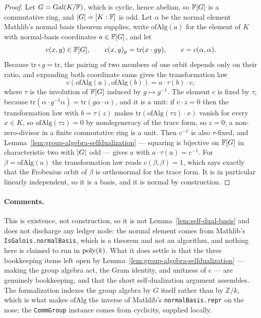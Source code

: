 \begin{proof}
\leanok
{}
Let $G = \mathrm{Gal}(K/\mathbb{F})$, which is cyclic, hence abelian, so $\mathbb{F}[G]$ is a commutative ring, and
$\left\vert {G} \right\vert = [K : \mathbb{F}]$ is odd. Let $\alpha$ be the normal element Mathlib's normal basis theorem
supplies, write $\mathrm{ofAlg}(a)$ for the element of $K$ with normal-basis coordinates
$a \in \mathbb{F}[G]$, and let
\[
  c(x, y) \in \mathbb{F}[G], \qquad c(x, y)_g = \mathrm{tr}(x \cdot g y), \qquad c = c(\alpha, \alpha).
\]
Because $\mathrm{tr} \circ g = \mathrm{tr}$, the pairing of two members of one orbit depends
only on their ratio, and expanding both coordinate sums gives the transformation law
\[
  c(\mathrm{ofAlg}(a), \mathrm{ofAlg}(b)) = a \cdot \tau(b) \cdot c,
\]
where $\tau$ is the involution of $\mathbb{F}[G]$ induced by $g \mapsto g^{-1}$. The element $c$ is
fixed by $\tau$, because $\mathrm{tr}(\alpha \cdot g^{-1}\alpha) =
\mathrm{tr}(g\alpha \cdot \alpha)$, and it is a unit: if $c \cdot z = 0$ then the
transformation law with $b = \tau(z)$ makes $\mathrm{tr}(\mathrm{ofAlg}(\tau z) \cdot x)$
vanish for every $x \in K$, so $\mathrm{ofAlg}(\tau z) = 0$ by nondegeneracy of the trace form,
so $z = 0$; a non-zero-divisor in a finite commutative ring is a unit. Then $c^{-1}$ is also
$\tau$-fixed, and Lemma~\ref{lem:group-algebra-selfdualization} --- squaring is bijective on
$\mathbb{F}[G]$ in characteristic two with $\left\vert {G} \right\vert$ odd --- gives $a$ with $a \cdot \tau(a) = c^{-1}$.
For $\beta = \mathrm{ofAlg}(a)$ the transformation law reads $c(\beta, \beta) = 1$, which says
exactly that the Frobenius orbit of $\beta$ is orthonormal for the trace form. It is in
particular linearly independent, so it is a basis, and it is normal by construction.
\end{proof}

\paragraph{Comments.} This is existence, not construction, so it is not
Lemma~\ref{lem:self-dual-basis} and does not discharge any ledger node: the normal element
comes from Mathlib's \texttt{IsGalois.normalBasis}, which is a theorem and not an algorithm,
and nothing here is claimed to run in $\mathrm{poly}(k)$. What it does settle is that the three
bookkeeping items left open by Lemma~\ref{lem:group-algebra-selfdualization} --- making the
group algebra act, the Gram identity, and unitness of $c$ --- are genuinely bookkeeping, and
that the short self-dualization argument assembles. The formalization indexes the group algebra
by $G$ itself rather than by $\mathbb{Z}/k$, which is what makes $\mathrm{ofAlg}$ the inverse of
Mathlib's \texttt{normalBasis.repr} on the nose; the \texttt{CommGroup} instance comes from
cyclicity, supplied locally.

